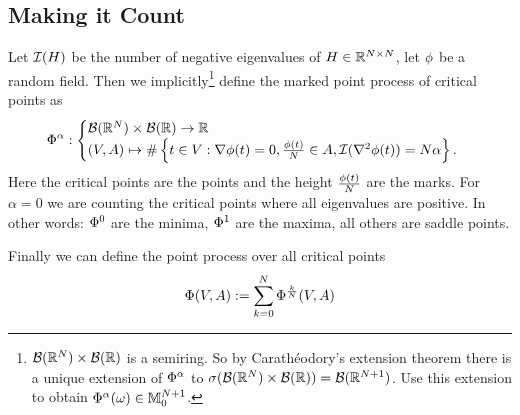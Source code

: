 \subsection{Making it Count}

\begin{definition}
	Let \(\negEV(H)\) be the number of negative eigenvalues of
	\(H\in\real^{\dimension\times\dimension}\), let \(\rf\) be a random field.
	Then we implicitly\footnote{
		\(\borel(\real^\dimension)\times\borel(\real)\) is a semiring. So by
		Carathéodory's extension theorem there is a unique extension of
		\(\crit^\alpha\) to
		\(\sigma(\borel(\real^\dimension)\times\borel(\real))=\borel(\real^{\dimension+1})\).
		Use this extension to obtain \(\crit^\alpha(\omega)\in\locFiniteMeasure[\dimension+1]\).
	} define the marked point process of critical points as
	\begin{align*}
		\crit^\alpha:
		\begin{cases}
			\borel(\real^\dimension)\times\borel(\real) \to \real\\
			(\Vol, A) \mapsto
			\#\left\{t\in\Vol:
				\nabla\rf(t)=0,
				\frac{\rf(t)}{\dimension}\in A,
				\negEV(\nabla^2 \rf(t))=\dimension\alpha
			\right\}.
		\end{cases}
	\end{align*}
	Here the critical points are the points and the height \(\frac{\rf(t)}\dimension\)
	are the marks. For \(\alpha=0\) we are counting the critical points where all
	eigenvalues are positive. In other words: \(\crit^0\) are the minima,
	\(\crit^1\) are the maxima, all others are saddle points.

	Finally we can define the point process over all critical points
	\[
		\crit(\Vol, A)
		:= \sum_{k=0}^\dimension \crit^{\frac{k}\dimension}(\Vol, A)
	\]
\end{definition}

